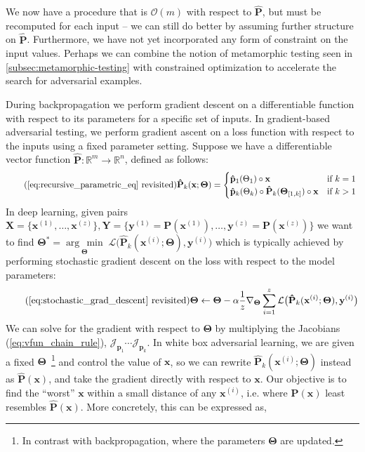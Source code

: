 \documentclass[12pt,initial,twoside,maitrise]{dms}
\newcommand{\argmin}[1]{\underset{#1}{\operatorname{arg}\,\operatorname{min}}\;}
\numberwithin{equation}{section}
\numberwithin{table}{chapter}
\numberwithin{figure}{chapter}
\begin{document}
We now have a procedure that is $\mathcal{O}(m)$ with respect to $\mathbf{\hat P}$, but must be recomputed for each input -- we can still do better by assuming further structure on $\mathbf{\hat P}$. Furthermore, we have not yet incorporated any form of constraint on the input values. Perhaps we can combine the notion of metamorphic testing seen in \autoref{subsec:metamorphic-testing} with constrained optimization to accelerate the search for adversarial examples.

During backpropagation we perform gradient descent on a differentiable function with respect to its parameters for a specific set of inputs. In gradient-based adversarial testing, we perform gradient ascent on a loss function with respect to the inputs using a fixed parameter setting. Suppose we have a differentiable vector function $\mathbf{\hat P}: \mathbb{R}^m\rightarrow\mathbb{R}^n$, defined as follows:
%
\begin{equation} \tag{\autoref{eq:recursive_parametric_eq} revisited}
    \mathbf{\hat P}_k(\mathbf{x}; \bm\Theta) = \begin{cases} \mathbf{\hat p}_1(\Theta_1)\circ\mathbf{x} &\text{if } k=1\\ \mathbf{\hat p}_k(\Theta_k)\circ \mathbf{\hat P}_{k}(\bm\Theta_{[1, k]})\circ\mathbf{x}&\text{if } k > 1 \end{cases} \\
\end{equation}
%
In deep learning, given pairs $\mathbf{X} = \{\mathbf{x}^{(1)}, \dots, \mathbf{x}^{(z)}\}, \mathbf{Y} = \{\mathbf{y}^{(1)} = \mathbf{P}(\mathbf{x}^{(1)}), \dots, \mathbf{y}^{(z)} = \mathbf{P}(\mathbf{x}^{(z)})\}$ we want to find $\bm\Theta^* = \argmin{\boldsymbol{\Theta}}\mathcal{L}\big(\mathbf{\hat P}_k(\mathbf{x}^{(i)}; \bm\Theta), \mathbf{y}^{(i)}\big)$ which is typically achieved by performing stochastic gradient descent on the loss with respect to the model parameters:
%
\begin{equation} \tag{\autoref{eq:stochastic_grad_descent} revisited}
    \bm\Theta \leftarrow \bm\Theta - \alpha\frac{1}{z}\nabla_{\bm\Theta} \sum_{i=1}^z\mathcal{L}\big(\mathbf{\hat P}_k(\mathbf{x}^{(i)}; \bm\Theta), \mathbf{y}^{(i)}\big)
\end{equation}
%
We can solve for the gradient with respect to $\bm\Theta$ by multiplying the Jacobians (\autoref{eq:vfun_chain_rule}), $\mathcal{J}_{\mathbf{p}_1} \cdots \mathcal{J}_{\mathbf{p}_k}$. In white box adversarial learning, we are given a fixed $\bm\Theta$~\footnote{In contrast with backpropagation, where the parameters $\bm\Theta$ are updated.} and control the value of $\mathbf x$, so we can rewrite $\mathbf{\hat P}_k(\mathbf{x}^{(i)};\bm\Theta)$ instead as $\mathbf{\hat P}(\mathbf x)$, and take the gradient directly with respect to $\mathbf x$. Our objective is to find the ``worst'' $\mathbf x$ within a small distance of any $\mathbf x^{(i)}$, i.e. where $\mathbf{P}(\mathbf x)$ least resembles $\mathbf{\hat P}(\mathbf x)$. More concretely, this can be expressed as,
\end{document}
